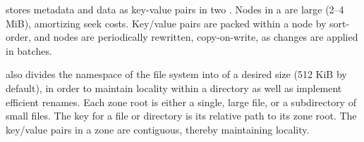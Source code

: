 \betrfs stores metadata and data as key-value
pairs in two \bets.  Nodes in a \bet are large (2--4 MiB),
amortizing seek costs.  Key/value pairs are packed
within a node by sort-order, and nodes are periodically rewritten,
copy-on-write, as changes are applied in batches.

\betrfs also divides the namespace of the file system into  of a
desired size (512 KiB by default), in order to maintain locality within a
directory as well as implement efficient renames.  Each zone root is either a
single, large file, or a subdirectory of small files.
The key for a file or directory is its relative path to its zone root. The
key/value pairs in a zone are contiguous, thereby maintaining locality.
